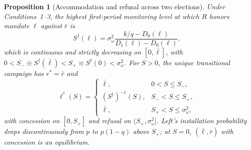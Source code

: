 \documentclass[11pt,letterpaper]{article}
\newtheorem{proposition}{Proposition}
\begin{document}
\begin{proposition}[Accommodation and refusal across two elections]\label{prop:main}
Under Conditions~1--3, the highest first-period monitoring level at which $R$ honors mandate $\ell$ against $\bar r$ is
\begin{equation}
 S^\dagger(\ell)=
 \sigma_\omega^2\frac{k/q-D_0(\ell)}{D_1(\ell)-D_0(\ell)} ,
 \label{eq:generalcut}
\end{equation}
which is continuous and strictly decreasing on $[0,\bar\ell]$, with $0<S_-\equiv S^\dagger(\bar\ell)<S_+\equiv S^\dagger(0)<\sigma_\omega^2$. For $S>0$, the unique transitional campaign has $r^*=\bar r$ and
\begin{equation}
 \ell^*(S)=
 \begin{cases}
 \bar\ell, & 0<S\le S_-,\\
 (S^\dagger)^{-1}(S), & S_-<S\le S_+,\\
 \bar\ell, & S_+<S\le\sigma_\omega^2 ,
 \end{cases}
 \label{eq:genstar}
\end{equation}
with concession on $[0,S_+]$ and refusal on $(S_+,\sigma_\omega^2]$. Left's installation probability drops discontinuously from $p$ to $p(1-q)$ above $S_+$; at $S=0$, $(\bar\ell,\bar r)$ with concession is an equilibrium.
\end{proposition}
\end{document}

